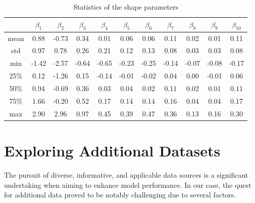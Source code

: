 \begin{table}[h]
    \centering
    \begin{tabular}{c | c c c c c c c c c c}
        \toprule
             & $\beta_1$ & $\beta_2$ & $\beta_3$ & $\beta_4$ & $\beta_5$ & $\beta_6$ & $\beta_7$ & $\beta_8$ & $\beta_9$ & $\beta_{10}$ \\
        \midrule
        mean & 0.88      & -0.73     & 0.34      & 0.01      & 0.06      & 0.06      & 0.11      & 0.02      & 0.01      & 0.11         \\

        std  & 0.97      & 0.78      & 0.26      & 0.21      & 0.12      & 0.13      & 0.08      & 0.03      & 0.03      & 0.08         \\

        min  & -1.42     & -2.57     & -0.64     & -0.65     & -0.23     & -0.25     & -0.14     & -0.07     & -0.08     &
        -0.17                                                                                                                           \\

        25\% & 0.12      & -1.26     & 0.15      & -0.14     & -0.01     & -0.02     & 0.04      & 0.00      & -0.01     & 0.06         \\

        50\% & 0.94      & -0.69     & 0.36      & 0.03      & 0.04      & 0.02      & 0.11      & 0.02      & 0.01      & 0.11         \\

        75\% & 1.66      & -0.20     & 0.52      & 0.17      & 0.14      & 0.14      & 0.16      & 0.04      & 0.04      & 0.17         \\

        max  & 2.90      & 2.96      & 0.97      & 0.45      & 0.39      & 0.47      & 0.36      & 0.13      & 0.16      & 0.30         \\
        \bottomrule
    \end{tabular}
    \caption{Statistics of the shape parameters}
\end{table}

\section{Exploring Additional Datasets}

The pursuit of diverse, informative, and applicable data sources is a
significant undertaking when aiming to enhance model performance. In our case,
the quest for additional data proved to be notably challenging due to several
factors.

